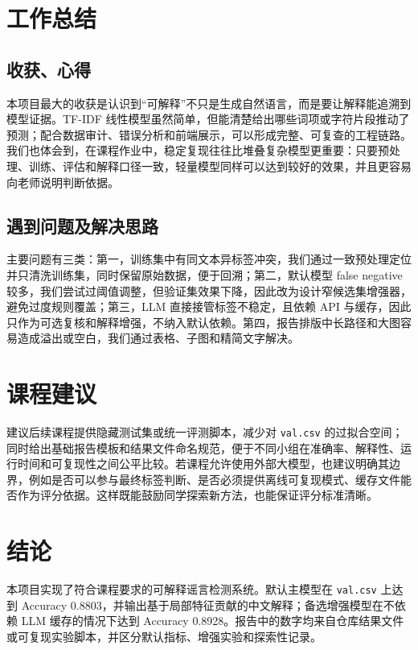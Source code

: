 \documentclass[UTF8,a4paper,11pt]{ctexart}
\begin{document}
\section{工作总结}
\subsection{收获、心得}
本项目最大的收获是认识到“可解释”不只是生成自然语言，而是要让解释能追溯到模型证据。TF-IDF 线性模型虽然简单，但能清楚给出哪些词项或字符片段推动了预测；配合数据审计、错误分析和前端展示，可以形成完整、可复查的工程链路。我们也体会到，在课程作业中，稳定复现往往比堆叠复杂模型更重要：只要预处理、训练、评估和解释口径一致，轻量模型同样可以达到较好的效果，并且更容易向老师说明判断依据。

\subsection{遇到问题及解决思路}
主要问题有三类：第一，训练集中有同文本异标签冲突，我们通过一致预处理定位并只清洗训练集，同时保留原始数据，便于回溯；第二，默认模型 false negative 较多，我们尝试过阈值调整，但验证集效果下降，因此改为设计窄候选集增强器，避免过度规则覆盖；第三，LLM 直接接管标签不稳定，且依赖 API 与缓存，因此只作为可选复核和解释增强，不纳入默认依赖。第四，报告排版中长路径和大图容易造成溢出或空白，我们通过表格、子图和精简文字解决。

\section{课程建议}
建议后续课程提供隐藏测试集或统一评测脚本，减少对 \texttt{val.csv} 的过拟合空间；同时给出基础报告模板和结果文件命名规范，便于不同小组在准确率、解释性、运行时间和可复现性之间公平比较。若课程允许使用外部大模型，也建议明确其边界，例如是否可以参与最终标签判断、是否必须提供离线可复现模式、缓存文件能否作为评分依据。这样既能鼓励同学探索新方法，也能保证评分标准清晰。

\section{结论}
本项目实现了符合课程要求的可解释谣言检测系统。默认主模型在 \texttt{val.csv} 上达到 Accuracy 0.8803，并输出基于局部特征贡献的中文解释；备选增强模型在不依赖 LLM 缓存的情况下达到 Accuracy 0.8928。报告中的数字均来自仓库结果文件或可复现实验脚本，并区分默认指标、增强实验和探索性记录。
\end{document}
